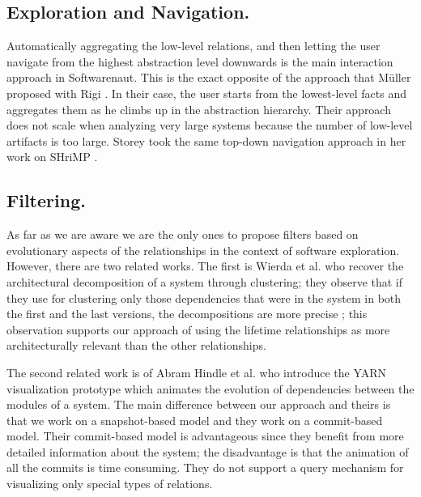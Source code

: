 \documentclass[preprint,12pt]{elsarticle}
\begin{document}
\subsection {Exploration and Navigation.} Automatically aggregating the low-level relations, and then letting the user navigate from the highest abstraction level downwards is the main interaction approach in Softwarenaut. This is the exact opposite of the approach that M{\"u}ller proposed with Rigi \cite{muller-revengenv}. In their case, the user starts from the lowest-level facts and aggregates them as he climbs up in the abstraction hierarchy. Their approach does not scale when analyzing very large systems because the number of low-level artifacts is too large. Storey took the same top-down navigation approach in her work on SHriMP \cite{storey-shrimp}.

\subsection {Filtering.} 

As far as we are aware we are the only ones to propose filters based on evolutionary aspects of the relationships in the context of software exploration. However, there are two related works. The first is Wierda et al. who recover the architectural decomposition of a system through clustering; they observe that if they use for clustering only those dependencies that were in the system in both the first and the last versions, the decompositions are more precise \cite{wierda-clustering}; this observation supports our approach of using the lifetime relationships as more architecturally relevant than the other relationships. 

The second related work is of Abram Hindle et al. \cite{hindle-yarn} who introduce the YARN visualization prototype which animates the evolution of dependencies between the modules of a system. The main difference between our approach and theirs is that we work on a snapshot-based model and they work on a commit-based model. Their commit-based model is advantageous since they benefit from more detailed information about the system; the disadvantage is that the animation of all the commits is time consuming. They do not support a query mechanism for visualizing only special types of relations.
\end{document}
